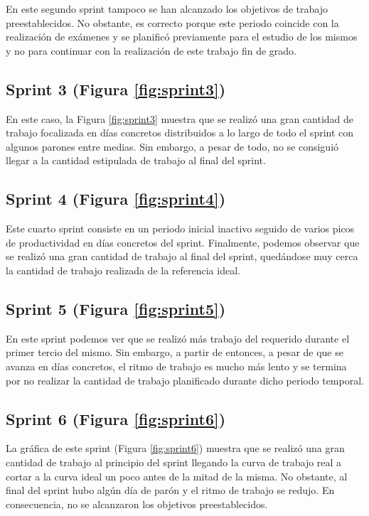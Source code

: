 En este segundo sprint tampoco se han alcanzado los objetivos de trabajo preestablecidos. No obstante, es correcto porque este periodo coincide con la realización de exámenes y se planificó previamente para el estudio de los mismos y no para continuar con la realización de este trabajo fin de grado.

\subsection{Sprint 3 (Figura \ref{fig:sprint3})}

En este caso, la Figura \ref{fig:sprint3} muestra que se realizó una gran cantidad de trabajo focalizada en días concretos distribuidos a lo largo de todo el sprint con algunos parones entre medias. Sin embargo, a pesar de todo, no se consiguió llegar a la cantidad estipulada de trabajo al final del sprint.

\subsection{Sprint 4 (Figura \ref{fig:sprint4})}

Este cuarto sprint consiste en un periodo inicial inactivo seguido de varios picos de productividad en días concretos del sprint. Finalmente, podemos observar que se realizó una gran cantidad de trabajo al final del sprint, quedándose muy cerca la cantidad de trabajo realizada de la referencia ideal.

\subsection{Sprint 5 (Figura \ref{fig:sprint5})}

En este sprint podemos ver que se realizó más trabajo del requerido durante el primer tercio del mismo. Sin embargo, a partir de entonces, a pesar de que se avanza en días concretos, el ritmo de trabajo es mucho más lento y se termina por no realizar la cantidad de trabajo planificado durante dicho periodo temporal.

\subsection{Sprint 6 (Figura \ref{fig:sprint6})}

La gráfica de este sprint (Figura \ref{fig:sprint6}) muestra que se realizó una gran cantidad de trabajo al principio del sprint llegando la curva de trabajo real a cortar a la curva ideal un poco antes de la mitad de la misma. No obstante, al final del sprint hubo algún día de parón y el ritmo de trabajo se redujo. En consecuencia, no se alcanzaron los objetivos preestablecidos.

